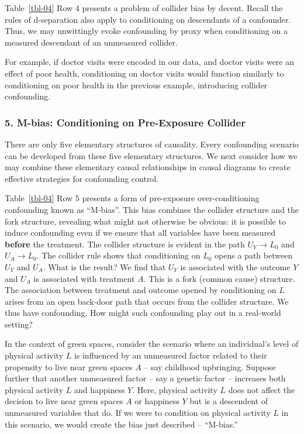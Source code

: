 \documentclass[
  singlecolumn]{article}
\begin{document}
Table~\ref{tbl-04} Row 4 presents a problem of collider bias by decent.
Recall the rules of d-separation also apply to conditioning on
descendants of a confounder. Thus, we may unwittingly evoke confounding
by proxy when conditioning on a measured descendant of an unmeasured
collider.

For example, if doctor visits were encoded in our data, and doctor
visits were an effect of poor health, conditioning on doctor visits
would function similarly to conditioning on poor health in the previous
example, introducing collider confounding.

\subsubsection{5. M-bias: Conditioning on Pre-Exposure
Collider}\label{m-bias-conditioning-on-pre-exposure-collider}

There are only five elementary structures of causality. Every
confounding scenario can be developed from these five elementary
structures. We next consider how we may combine these elementary causal
relationships in causal diagrams to create effective strategies for
confounding control.

Table~\ref{tbl-04} Row 5 presents a form of pre-exposure
over-conditioning confounding known as ``M-bias''. This bias combines
the collider structure and the fork structure, revealing what might not
otherwise be obvious: it is possible to induce confounding even if we
ensure that all variables have been measured \textbf{before} the
treatment. The collider structure is evident in the path \(U_Y \to L_0\)
and \(U_A \to L_0\). The collider rule shows that conditioning on
\(L_0\) opens a path between \(U_Y\) and \(U_A\). What is the result? We
find that \(U_Y\) is associated with the outcome \(Y\) and \(U_A\) is
associated with treatment \(A\). This is a fork (common cause)
structure. The association between treatment and outcome opened by
conditioning on \(L\) arises from an open back-door path that occurs
from the collider structure. We thus have confounding. How might such
confounding play out in a real-world setting?

In the context of green spaces, consider the scenario where an
individual's level of physical activity \(L\) is influenced by an
unmeasured factor related to their propensity to live near green spaces
\(A\) -- say childhood upbringing. Suppose further that another
unmeasured factor -- say a genetic factor -- increases both physical
activity \(L\) and happiness \(Y\). Here, physical activity \(L\) does
not affect the decision to live near green spaces \(A\) or happiness
\(Y\) but is a descendent of unmeasured variables that do. If we were to
condition on physical activity \(L\) in this scenario, we would create
the bias just described -- ``M-bias.''
\end{document}
